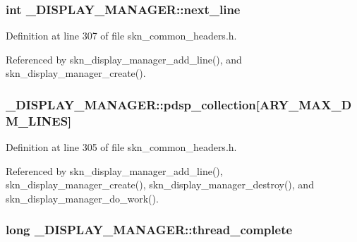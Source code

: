 \subsubsection[{\texorpdfstring{next\+\_\+line}{next_line}}]{\setlength{\rightskip}{0pt plus 5cm}int \+\_\+\+D\+I\+S\+P\+L\+A\+Y\+\_\+\+M\+A\+N\+A\+G\+E\+R\+::next\+\_\+line}\hypertarget{struct___d_i_s_p_l_a_y___m_a_n_a_g_e_r_aed299ac3603bba3dfe3c09389122f8d8}{}\label{struct___d_i_s_p_l_a_y___m_a_n_a_g_e_r_aed299ac3603bba3dfe3c09389122f8d8}


Definition at line 307 of file skn\+\_\+common\+\_\+headers.\+h.



Referenced by skn\+\_\+display\+\_\+manager\+\_\+add\+\_\+line(), and skn\+\_\+display\+\_\+manager\+\_\+create().

\subsubsection[{\texorpdfstring{pdsp\+\_\+collection}{pdsp_collection}}]{ \+\_\+\+D\+I\+S\+P\+L\+A\+Y\+\_\+\+M\+A\+N\+A\+G\+E\+R\+::pdsp\+\_\+collection\mbox{[}{\bf A\+R\+Y\+\_\+\+M\+A\+X\+\_\+\+D\+M\+\_\+\+L\+I\+N\+ES}\mbox{]}}\hypertarget{struct___d_i_s_p_l_a_y___m_a_n_a_g_e_r_a3a5ccb906320bd6aecbf89cb6b0fc234}{}\label{struct___d_i_s_p_l_a_y___m_a_n_a_g_e_r_a3a5ccb906320bd6aecbf89cb6b0fc234}


Definition at line 305 of file skn\+\_\+common\+\_\+headers.\+h.



Referenced by skn\+\_\+display\+\_\+manager\+\_\+add\+\_\+line(), skn\+\_\+display\+\_\+manager\+\_\+create(), skn\+\_\+display\+\_\+manager\+\_\+destroy(), and skn\+\_\+display\+\_\+manager\+\_\+do\+\_\+work().

\subsubsection[{\texorpdfstring{thread\+\_\+complete}{thread_complete}}]{\setlength{\rightskip}{0pt plus 5cm}long \+\_\+\+D\+I\+S\+P\+L\+A\+Y\+\_\+\+M\+A\+N\+A\+G\+E\+R\+::thread\+\_\+complete}\hypertarget{struct___d_i_s_p_l_a_y___m_a_n_a_g_e_r_ae20e9cf0e6789ce07c5b8005b4a7ada0}{}\label{struct___d_i_s_p_l_a_y___m_a_n_a_g_e_r_ae20e9cf0e6789ce07c5b8005b4a7ada0}


